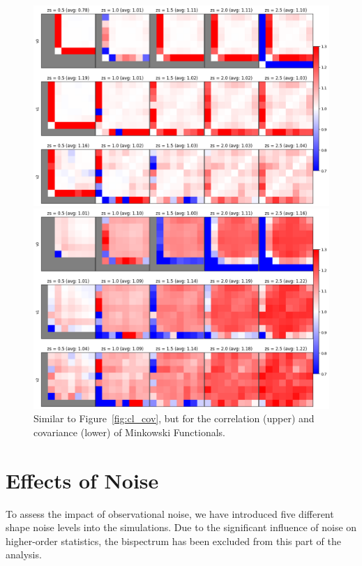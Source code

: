 \begin{figure}[p]
    \centering
    \includegraphics[width=\textwidth]{figures/results/mfs_corr.png}
    \caption{Similar to Figure~\ref{fig:cl_cov}, but for the correlation (upper) and covariance (lower) of Minkowski Functionals. }
    \label{fig:mfs_cov}
    \vspace{0.5cm}
    \includegraphics[width=\textwidth]{figures/results/mfs_cov.png}
\end{figure}

\section{Effects of Noise}
To assess the impact of observational noise, we have introduced five different shape noise levels into the simulations. Due to the significant influence of noise on higher-order statistics, the bispectrum has been excluded from this part of the analysis.

